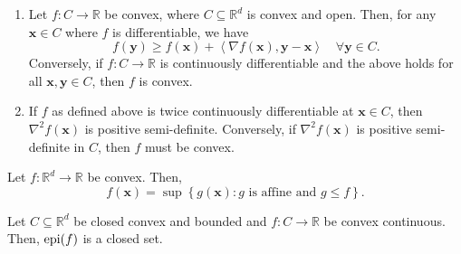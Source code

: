 \begin{thm}
    \begin{enumerate}
        \item Let $f \colon C \to \mathbb{R}$ be convex, where $C \subseteq \mathbb{R}^d$ is convex and open. Then, for any $\mathbf{x} \in C$ where $f$ is differentiable, we have
        \[
            f(\mathbf{y}) \geq f(\mathbf{x}) +  \left\langle \nabla f(\mathbf{x}), \mathbf{y} - \mathbf{x} \right\rangle \quad \forall \mathbf{y} \in C.
        \]
        Conversely, if $f \colon C \to \mathbb{R}$ is continuously differentiable and the above holds for all $\mathbf{x}, \mathbf{y} \in C$, then $f$ is convex. 

        \item If $f$ as defined above is twice continuously differentiable at $\mathbf{x} \in C$, then $\nabla^2f(\mathbf{x})$ is positive semi-definite. Conversely, if $\nabla^2f(\mathbf{x})$ is positive semi-definite in $C$, then $f$ must be convex. 
    \end{enumerate}
\end{thm}

\begin{thm}
    Let $f \colon \mathbb{R}^d \to \mathbb{R}$ be convex. Then, 
    \[
        f(\mathbf{x}) = \sup \left\{ g(\mathbf{x}) \colon g \text{ is affine and } g \leq f \right\}.
    \]
\end{thm}

\begin{thm}
    Let $C \subseteq \mathbb{R}^d$ be closed convex and bounded and $f \colon C \to \mathbb{R}$ be convex continuous. Then, $\operatorname*{epi}(f)$ is a closed set. 
\end{thm}